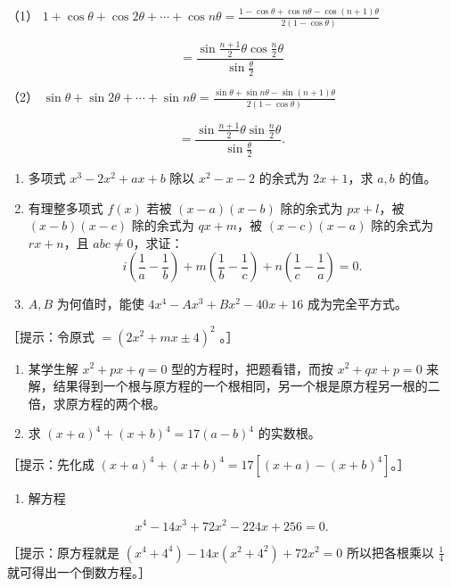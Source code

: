 （1）
\(1 + \cos \theta + \cos 2\theta + \cdots + \cos n\theta = \frac{1 - \cos \theta + \cos n\theta - \cos(n + 1)\theta}{2(1 - \cos \theta)}\)

\[
= \frac {\sin \frac {n + 1}{2} \theta \cos \frac {n}{2} \theta}{\sin \frac {\theta}{2}}
\]

（2）
\(\sin \theta + \sin 2\theta + \cdots + \sin n\theta = \frac{\sin\theta + \sin n\theta - \sin(n + 1)\theta}{2(1 - \cos\theta)}\)

\[
= \frac {\sin \frac {n + 1}{2} \theta \sin \frac {n}{2} \theta}{\sin \frac {\theta}{2}}.
\]

\begin{enumerate}[start=20]
\item
  多项式 \(x^{3} - 2x^{2} + ax + b\) 除以 \(x^{2} - x - 2\) 的余式为
  \(2x + 1\)，求 \(a, b\) 的值。
\item
  有理整多项式 \(f(x)\) 若被 \((x - a)(x - b)\) 除的余式为
  \(px + l\)，被 \((x - b)(x - c)\) 除的余式为 \(qx + m\)，被
  \((x - c)(x - a)\) 除的余式为 \(rx + n\)，且 \(abc \neq 0\)，求证：
\[
i \left(\frac {1}{a} - \frac {1}{b}\right) + m \left(\frac {1}{b} - \frac {1}{c}\right) + n \left(\frac {1}{c} - \frac {1}{a}\right) = 0.
\]
\item
  \(A, B\) 为何值时，能使 \(4x^{4} - Ax^{3} + Bx^{2} - 40x + 16\)
  成为完全平方式。
\end{enumerate}

［提示：令原式 \(=(2x^{2}+mx\pm4)^{2}\) 。］

\begin{enumerate}[start=23]
\item
  某学生解 \(x^{2} + px + q = 0\) 型的方程时，把题看错，而按
  \(x^{2} + qx + p = 0\)
  来解，结果得到一个根与原方程的一个根相同，另一个根是原方程另一根的二倍，求原方程的两个根。
\item
  求 \((x + a)^{4} + (x + b)^{4} = 17(a - b)^{4}\) 的实数根。
\end{enumerate}

［提示：先化成
\((x + a)^{4} + (x + b)^{4} = 17[(x + a) - (x + b)^{4}]\)。］

\begin{enumerate}[start=25]
\item
  解方程
\end{enumerate}

\[
x ^ {4} - 14 x ^ {3} + 72 x ^ {2} - 224 x + 256 = 0.
\]

［提示：原方程就是
\((x^{4} + 4^{4}) - 14x(x^{2} + 4^{2}) + 72x^{2} = 0\) 所以把各根乘以
\(\frac{1}{4}\) 就可得出一个倒数方程。］

